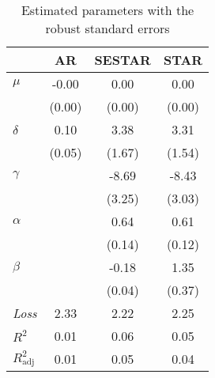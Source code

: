 \begin{table}[htbp]
\centering
\caption{Estimated parameters with the robust standard errors}
\begin{tabular}{lccc}
\toprule
 & AR & SESTAR & STAR \\
\midrule
$\mu$ & -0.00 & 0.00 & 0.00 \\
 & (0.00) & (0.00) & (0.00) \\
$\delta$ & 0.10 & 3.38 & 3.31 \\
 & (0.05) & (1.67) & (1.54) \\
$\gamma$ &  & -8.69 & -8.43 \\
 &  & (3.25) & (3.03) \\
$\alpha$ &  & 0.64 & 0.61 \\
 &  & (0.14) & (0.12) \\
$\beta$ &  & -0.18 & 1.35 \\
 &  & (0.04) & (0.37) \\
\addlinespace
\emph{Loss} & 2.33 & 2.22 & 2.25 \\
$R^2$ & 0.01 & 0.06 & 0.05 \\
$R^2_{\text{adj}}$ & 0.01 & 0.05 & 0.04 \\
\bottomrule
\end{tabular}
\end{table}